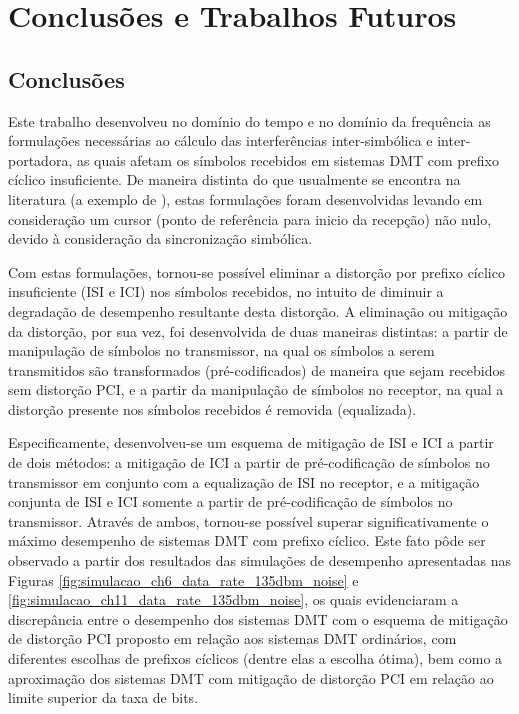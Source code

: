 \chapter{Conclusões e Trabalhos Futuros}
\label{ch:conclusoes}

\section{Conclusões}

Este trabalho desenvolveu no domínio do tempo e no domínio da frequência as formulações necessárias ao cálculo das interferências inter-simbólica e inter-portadora, as quais afetam os símbolos recebidos em sistemas DMT com prefixo cíclico insuficiente. De maneira distinta do que usualmente se encontra na literatura (a exemplo de \cite{Malkin08,perodling2002}), estas formulações foram desenvolvidas levando em consideração um cursor (ponto de referência para inicio da recepção) não nulo, devido à consideração da sincronização simbólica.

Com estas formulações, tornou-se possível eliminar a distorção por prefixo cíclico insuficiente  (ISI e ICI) nos símbolos recebidos, no intuito de diminuir a degradação de desempenho resultante desta distorção. A eliminação ou mitigação da distorção, por sua vez, foi desenvolvida de duas maneiras distintas: a partir de manipulação de símbolos no transmissor, na qual os símbolos a serem transmitidos são transformados (pré-codificados) de maneira que sejam recebidos sem distorção PCI, e a partir da manipulação de símbolos no receptor, na qual a distorção presente nos símbolos recebidos é removida (equalizada).

Especificamente, desenvolveu-se um esquema de mitigação de ISI e ICI a partir de dois métodos: a mitigação de ICI a partir de pré-codificação de símbolos no transmissor em conjunto com a equalização de ISI no receptor, e a mitigação conjunta de ISI e ICI somente a partir de pré-codificação de símbolos no transmissor. Através de ambos, tornou-se possível superar significativamente o máximo desempenho de sistemas DMT com prefixo cíclico. Este fato pôde ser observado a partir dos resultados das simulações de desempenho apresentadas nas Figuras \ref{fig:simulacao_ch6_data_rate_135dbm_noise} e \ref{fig:simulacao_ch11_data_rate_135dbm_noise}, os quais evidenciaram a discrepância entre o desempenho dos sistemas DMT com o esquema de mitigação de distorção PCI proposto em relação aos sistemas DMT ordinários, com diferentes escolhas de prefixos cíclicos (dentre elas a escolha ótima), bem como a aproximação dos sistemas DMT com mitigação de distorção PCI em relação ao limite superior da taxa de bits.

